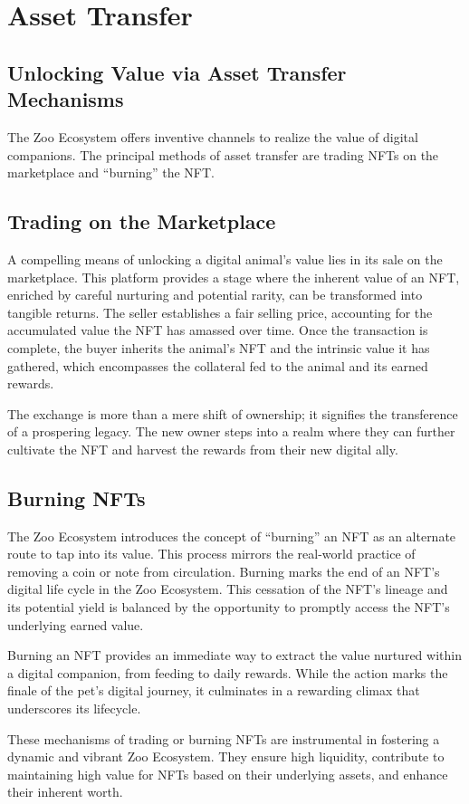 \section{Asset Transfer}

\subsection{Unlocking Value via Asset Transfer Mechanisms}

The Zoo Ecosystem offers inventive channels to realize the value of digital companions. The principal methods of asset transfer are trading NFTs on the marketplace and ``burning'' the NFT.

\subsection{Trading on the Marketplace}

A compelling means of unlocking a digital animal's value lies in its sale on the marketplace. This platform provides a stage where the inherent value of an NFT, enriched by careful nurturing and potential rarity, can be transformed into tangible returns. The seller establishes a fair selling price, accounting for the accumulated value the NFT has amassed over time. Once the transaction is complete, the buyer inherits the animal's NFT and the intrinsic value it has gathered, which encompasses the collateral fed to the animal and its earned rewards.

The exchange is more than a mere shift of ownership; it signifies the transference of a prospering legacy. The new owner steps into a realm where they can further cultivate the NFT and harvest the rewards from their new digital ally.

\subsection{Burning NFTs}

The Zoo Ecosystem introduces the concept of ``burning'' an NFT as an alternate route to tap into its value. This process mirrors the real-world practice of removing a coin or note from circulation. Burning marks the end of an NFT's digital life cycle in the Zoo Ecosystem. This cessation of the NFT's lineage and its potential yield is balanced by the opportunity to promptly access the NFT's underlying earned value.

Burning an NFT provides an immediate way to extract the value nurtured within a digital companion, from feeding to daily rewards. While the action marks the finale of the pet's digital journey, it culminates in a rewarding climax that underscores its lifecycle.

These mechanisms of trading or burning NFTs are instrumental in fostering a dynamic and vibrant Zoo Ecosystem. They ensure high liquidity, contribute to maintaining high value for NFTs based on their underlying assets, and enhance their inherent worth.
